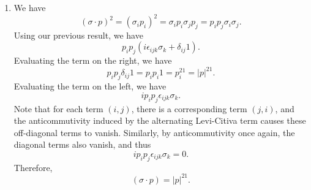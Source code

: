 \documentclass[11pt, letterpaper]{article}
\begin{document}
\begin{enumerate}
\[\begin{pmatrix}
			1 & 0 \\
			0 & -1
			\end{pmatrix}-\begin{pmatrix}
			1 & 0 \\
			0 & -1
			\end{pmatrix}\begin{pmatrix}
			0 & -i \\
			i & 0
			\end{pmatrix}=\begin{pmatrix}
			0 & i \\
			i & 0
			\end{pmatrix}-\begin{pmatrix}
			0 & -i \\
			-i & 0
			\end{pmatrix}=2i\sigma_1
		.\]
		\[
			\left[ \sigma _3,\sigma _1 \right] =\begin{pmatrix}
			1 & 0 \\
			0 & -1
			\end{pmatrix}\begin{pmatrix}
			0 & 1 \\
			1 & 0
			\end{pmatrix}-\begin{pmatrix}
			0 & 1 \\
			1 & 0
			\end{pmatrix}\begin{pmatrix}
			1 & 0 \\
			0 & -1
			\end{pmatrix}=\begin{pmatrix}
			0 & 1 \\
			-1 & 0
			\end{pmatrix}-\begin{pmatrix}
			0 & -1 \\
			1 & 0
			\end{pmatrix}=\begin{pmatrix}
			0 & 2 \\
			-2 & 0
			\end{pmatrix}=2i\sigma_2
		.\]
		Therefore,
		\[
			\sigma _i\sigma _j=i\epsilon_{ijk} \sigma _k+\delta_{ij} 1
		.\]
	\item We have
		\[
			\left( \sigma\cdot p \right) ^2=\left( \sigma_i p_i \right) ^2=\sigma _ip_i\sigma _jp_j=p_ip_j\sigma _i\sigma _j
		.\]
		Using our previous result, we have
		\[
			p_ip_j\left( i \epsilon_{ijk}\sigma_k+\delta_{ij} 1 \right) 
		.\]
		Evaluating the term on the right, we have
		\[
			p_ip_j\delta_{ij}1 =p_ip_i1=p_i^21=\left| p \right| ^21
		.\]
		Evaluating the term on the left, we have
		\[
			ip_ip_j\epsilon_{ijk} \sigma _k
		.\]
		Note that for each term $(i,j)$, there is a corresponding term $(j,i)$, and the anticommutivity induced by the alternating Levi-Citiva term causes these off-diagonal terms to vanish. Similarly, by anticommutivity once again, the diagonal terms also vanish, and thus
		\[
			ip_ip_j\epsilon_{ijk} \sigma _k=0
		.\]
		Therefore,
		\[
			\left( \sigma \cdot p \right) =\left| p \right| ^21
		.\]
\end{enumerate}
\end{document}
